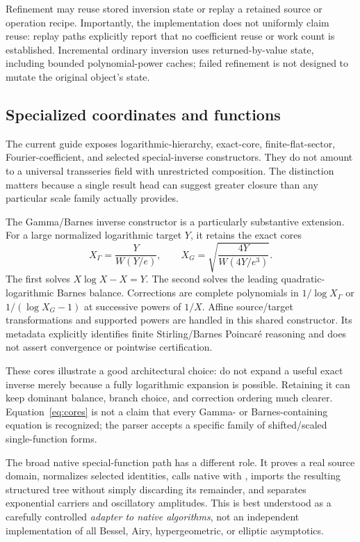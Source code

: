 \documentclass[11pt,a4paper]{article}
\newcommand{\code}[1]{\texttt{\detokenize{#1}}}
\begin{document}
Refinement may reuse stored inversion state or replay a retained source or operation recipe. Importantly, the implementation does not uniformly claim reuse: replay paths explicitly report that no coefficient reuse or work count is established. Incremental ordinary inversion uses returned-by-value state, including bounded polynomial-power caches; failed refinement is not designed to mutate the original object's state.\cite{ops,incremental}

\subsection{Specialized coordinates and functions}

The current guide exposes logarithmic-hierarchy, exact-core, finite-flat-sector, Fourier-coefficient, and selected special-inverse constructors. They do not amount to a universal transseries field with unrestricted composition. The distinction matters because a single result head can suggest greater closure than any particular scale family actually provides.\cite{guide}

The Gamma/Barnes inverse constructor is a particularly substantive extension. For a large normalized logarithmic target $Y$, it retains the exact cores
\begin{equation}\label{eq:cores}
 X_\Gamma=\frac{Y}{W(Y/e)},\qquad
 X_G=\sqrt{\frac{4Y}{W(4Y/e^3)}}.
\end{equation}
The first solves $X\log X-X=Y$. The second solves the leading quadratic-logarithmic Barnes balance. Corrections are complete polynomials in $1/\log X_\Gamma$ or $1/(\log X_G-1)$ at successive powers of $1/X$. Affine source/target transformations and supported powers are handled in this shared constructor. Its metadata explicitly identifies finite Stirling/Barnes Poincar\'e reasoning and does not assert convergence or pointwise certification.\cite{gamma,wl-lambert,dlmf-gamma}

These cores illustrate a good architectural choice: do not expand a useful exact inverse merely because a fully logarithmic expansion is possible. Retaining it can keep dominant balance, branch choice, and correction ordering much clearer. Equation~\eqref{eq:cores} is not a claim that every Gamma- or Barnes-containing equation is recognized; the parser accepts a specific family of shifted/scaled single-function forms.\cite{gamma}

The broad native special-function path has a different role. It proves a real source domain, normalizes selected identities, calls native \code{Series} with \code{Analytic -> False}, imports the resulting structured tree without simply discarding its remainder, and separates exponential carriers and oscillatory amplitudes. This is best understood as a carefully controlled \emph{adapter to native algorithms}, not an independent implementation of all Bessel, Airy, hypergeometric, or elliptic asymptotics.\cite{native}
\end{document}
